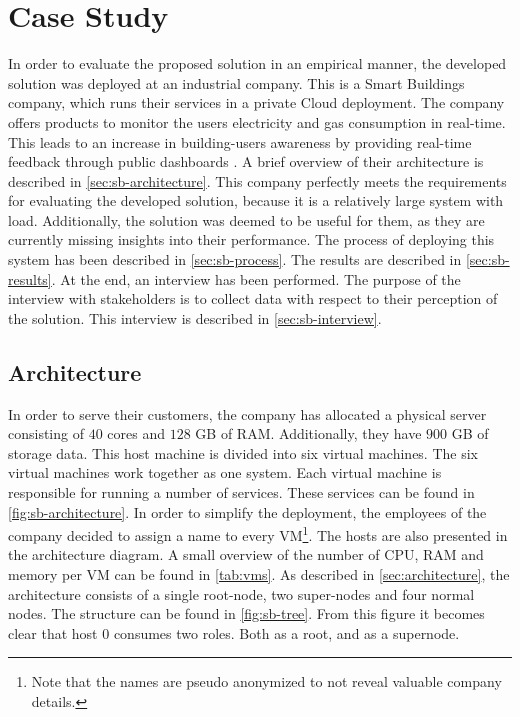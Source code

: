 \chapter{Case Study}\label{ch:case_study}
In order to evaluate the proposed solution in an empirical manner, the developed solution was deployed at an industrial company. This is a Smart Buildings company, which runs their services in a private Cloud deployment. The company offers products to monitor the users electricity and gas consumption in real-time. This leads to an increase in building-users awareness by providing real-time feedback through public dashboards \cite{sb}. A brief overview of their architecture is described in \autoref{sec:sb-architecture}. This company perfectly meets the requirements for evaluating the developed solution, because it is a relatively large system with load. Additionally, the solution was deemed to be useful for them, as they are currently missing insights into their performance. The process of deploying this system has been described in \autoref{sec:sb-process}. The results are described in \autoref{sec:sb-results}. At the end, an interview has been performed. The purpose of the interview with stakeholders is to collect data with respect to their perception of the solution. This interview is described in \autoref{sec:sb-interview}.

\section{Architecture} \label{sec:sb-architecture}
In order to serve their customers, the company has allocated a physical server consisting of $40$ cores and $128$ GB of RAM. Additionally, they have $900$ GB of storage data. This host machine is divided into six virtual machines. The six virtual machines work together as one system. Each virtual machine is responsible for running a number of services. These services can be found in \autoref{fig:sb-architecture}. In order to simplify the deployment, the employees of the company decided to assign a name to every VM\footnote{Note that the names are pseudo anonymized to not reveal valuable company details.}. The hosts are also presented in the architecture diagram. A small overview of the number of CPU, RAM and memory per VM can be found in \autoref{tab:vms}. As described in \autoref{sec:architecture}, the architecture consists of a single root-node, two super-nodes and four normal nodes. The structure can be found in \autoref{fig:sb-tree}. From this figure it becomes clear that host $0$ consumes two roles. Both as a root, and as a supernode.


